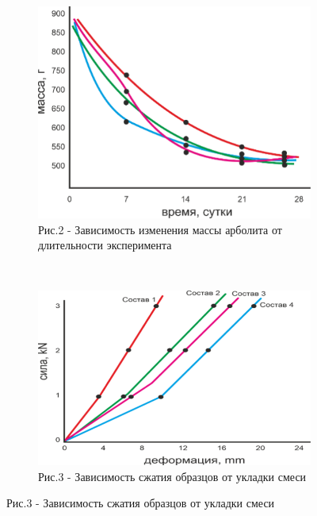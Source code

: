 \begin{figure}[H]
    \centering
    \begin{subfigure}[b]{0.4\textwidth}
        \centering
        \includegraphics[width=\textwidth]{media/chem/image3}
        \caption*{Рис.2 - Зависимость изменения массы арболита от длительности эксперимента}
    \end{subfigure}
    ~
    \begin{subfigure}[b]{0.5\textwidth}
        \centering
        \includegraphics[width=\textwidth]{media/chem/image4}
        \caption*{Рис.3 - Зависимость сжатия образцов от укладки смеси}
    \end{subfigure}
\end{figure}

